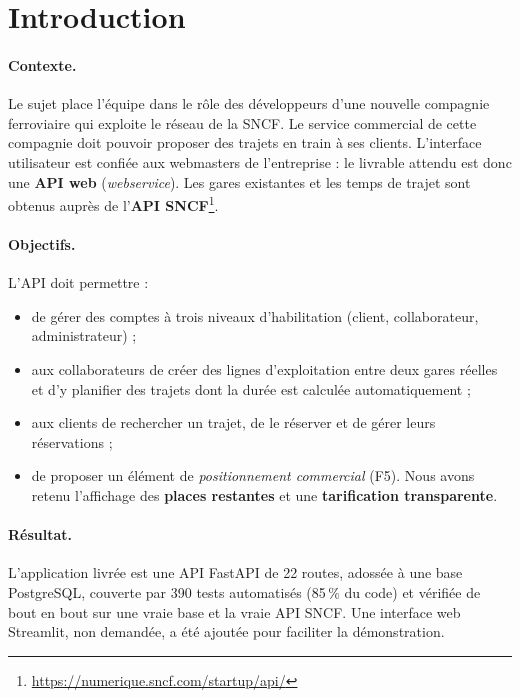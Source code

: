 \documentclass[11pt,a4paper]{article}
\begin{document}
\tableofcontents
\newpage

\section{Introduction}

\paragraph{Contexte.}
Le sujet place l'équipe dans le rôle des développeurs d'une nouvelle compagnie ferroviaire qui
exploite le réseau de la SNCF. Le service commercial de cette compagnie doit pouvoir proposer des
trajets en train à ses clients. L'interface utilisateur est confiée aux webmasters de l'entreprise :
le livrable attendu est donc une \textbf{API web} (\emph{webservice}). Les gares existantes et les
temps de trajet sont obtenus auprès de l'\textbf{API SNCF}\footnote{\url{https://numerique.sncf.com/startup/api/}}.

\paragraph{Objectifs.}
L'API doit permettre :
\begin{itemize}[nosep]
  \item de gérer des comptes à trois niveaux d'habilitation (client, collaborateur, administrateur) ;
  \item aux collaborateurs de créer des lignes d'exploitation entre deux gares réelles et d'y
        planifier des trajets dont la durée est calculée automatiquement ;
  \item aux clients de rechercher un trajet, de le réserver et de gérer leurs réservations ;
  \item de proposer un élément de \emph{positionnement commercial} (F5). Nous avons retenu
        l'affichage des \textbf{places restantes} et une \textbf{tarification transparente}.
\end{itemize}

\paragraph{Résultat.}
L'application livrée est une API FastAPI de 22 routes, adossée à une base PostgreSQL, couverte par
390 tests automatisés (85\,\% du code) et vérifiée de bout en bout sur une vraie base et la vraie
API SNCF. Une interface web Streamlit, non demandée, a été ajoutée pour faciliter la démonstration.
\end{document}
